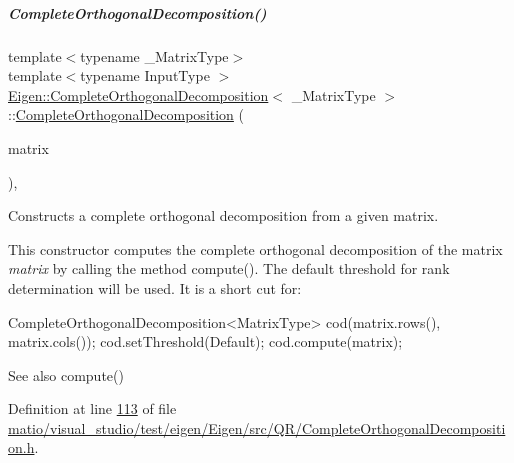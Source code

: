 \mbox{\label{group___q_r___module_afcfaf7a395f853247c23bb52b1ffb1cc}} 
\subparagraph{\texorpdfstring{Complete\+Orthogonal\+Decomposition()}{CompleteOrthogonalDecomposition()}\hspace{0.1cm}{\footnotesize\ttfamily [7/8]}}
{\footnotesize\ttfamily template$<$typename \+\_\+\+Matrix\+Type$>$ \\
template$<$typename Input\+Type $>$ \\
\hyperlink{group___q_r___module_class_eigen_1_1_complete_orthogonal_decomposition}{Eigen\+::\+Complete\+Orthogonal\+Decomposition}$<$ \+\_\+\+Matrix\+Type $>$\+::\hyperlink{group___q_r___module_class_eigen_1_1_complete_orthogonal_decomposition}{Complete\+Orthogonal\+Decomposition} (\begin{DoxyParamCaption}\item[{const \hyperlink{group___core___module_struct_eigen_1_1_eigen_base}{Eigen\+Base}$<$ Input\+Type $>$ \&}]{matrix }\end{DoxyParamCaption})\hspace{0.3cm}{\ttfamily [inline]}, {\ttfamily [explicit]}}



Constructs a complete orthogonal decomposition from a given matrix. 

This constructor computes the complete orthogonal decomposition of the matrix {\itshape matrix} by calling the method compute(). The default threshold for rank determination will be used. It is a short cut for\+:


\begin{DoxyCode}
CompleteOrthogonalDecomposition<MatrixType> cod(matrix.rows(),
                                                matrix.cols());
cod.setThreshold(Default);
cod.compute(matrix);
\end{DoxyCode}


\begin{DoxySeeAlso}{See also}
compute() 
\end{DoxySeeAlso}


Definition at line \hyperlink{matio_2visual__studio_2test_2eigen_2_eigen_2src_2_q_r_2_complete_orthogonal_decomposition_8h_source_l00113}{113} of file \hyperlink{matio_2visual__studio_2test_2eigen_2_eigen_2src_2_q_r_2_complete_orthogonal_decomposition_8h_source}{matio/visual\+\_\+studio/test/eigen/\+Eigen/src/\+Q\+R/\+Complete\+Orthogonal\+Decomposition.\+h}.

